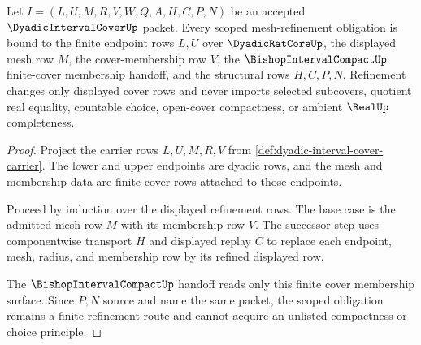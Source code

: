 \begin{theorem}
\label{thm:dyadicintervalcover-mesh-refinement-scope}
Let $I=(L,U,M,R,V,W,Q,A,H,C,P,N)$ be an accepted $\DyadicIntervalCoverUp$ packet. Every scoped mesh-refinement obligation is bound to the finite endpoint rows $L,U$ over $\DyadicRatCoreUp$, the displayed mesh row $M$, the cover-membership row $V$, the $\BishopIntervalCompactUp$ finite-cover membership handoff, and the structural rows $H,C,P,N$. Refinement changes only displayed cover rows and never imports selected subcovers, quotient real equality, countable choice, open-cover compactness, or ambient $\RealUp$ completeness.
\end{theorem}
\begin{proof}
Project the carrier rows $L,U,M,R,V$ from \autoref{def:dyadic-interval-cover-carrier}. The lower and upper endpoints are dyadic rows, and the mesh and membership data are finite cover rows attached to those endpoints.

Proceed by induction over the displayed refinement rows. The base case is the admitted mesh row $M$ with its membership row $V$. The successor step uses componentwise transport $H$ and displayed replay $C$ to replace each endpoint, mesh, radius, and membership row by its refined displayed row.

The $\BishopIntervalCompactUp$ handoff reads only this finite cover membership surface. Since $P,N$ source and name the same packet, the scoped obligation remains a finite refinement route and cannot acquire an unlisted compactness or choice principle.
\end{proof}

